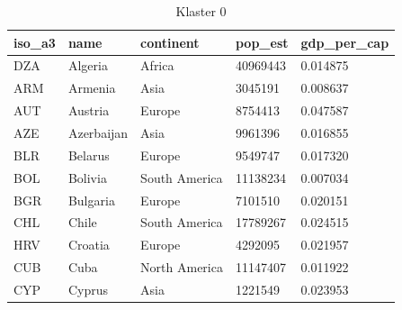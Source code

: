 \documentclass[11pt]{report}
\begin{document}
    \begin{table}[h!]
        \caption {Klaster 0} \label{tab:cl0}
        \begin{tabular}{lllll}
            \hline
            \multicolumn{1}{|l|}{iso\_a3} & \multicolumn{1}{l|}{name} & \multicolumn{1}{l|}{continent} & \multicolumn{1}{l|}{pop\_est} & \multicolumn{1}{l|}{gdp\_per\_cap} \\ \hline
            DZA                           & Algeria                   & Africa                         & 40969443                      & 0.014875                           \\
            ARM                           & Armenia                   & Asia                           & 3045191                       & 0.008637                           \\
            AUT                           & Austria                   & Europe                         & 8754413                       & 0.047587                           \\
            AZE                           & Azerbaijan                & Asia                           & 9961396                       & 0.016855                           \\
            BLR                           & Belarus                   & Europe                         & 9549747                       & 0.017320                           \\
            BOL                           & Bolivia                   & South America                  & 11138234                      & 0.007034                           \\
            BGR                           & Bulgaria                  & Europe                         & 7101510                       & 0.020151                           \\
            CHL                           & Chile                     & South America                  & 17789267                      & 0.024515                           \\
            HRV                           & Croatia                   & Europe                         & 4292095                       & 0.021957                           \\
            CUB                           & Cuba                      & North America                  & 11147407                      & 0.011922                           \\
            CYP                           & Cyprus                    & Asia                           & 1221549                       & 0.023953                           \\

\end{tabular}
\end{table}
\end{document}
